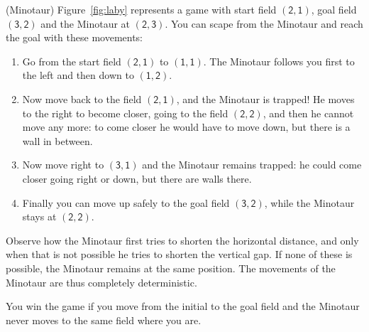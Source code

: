 \documentclass[a4paper,12pt]{article}
\begin{document}
\begin{PraktikumsAufgabe}{3}{(Minotaur)}
\noindent
Figure~\ref{fig:laby} represents a game with start field 
$(\textsf{2},\textsf{1})$, 
goal field 
$(\textsf{3},\textsf{2})$ and the Minotaur at
$(\textsf{2},\textsf{3})$.
You can scape from the Minotaur and reach the goal 
with these movements:
\begin{enumerate}
\item Go from the start field $(\textsf{2},\textsf{1})$ to $(\textsf{1},\textsf{1})$.
      The Minotaur follows you first to the left and then down to $(\textsf{1},\textsf{2})$.
\item Now move back to the field $(\textsf{2},\textsf{1})$, and the Minotaur is trapped!
      He moves to the right to become closer, going to the field $(\textsf{2},\textsf{2})$, 
      and then he cannot move any more: 
      to come closer he would have to move down, 
      but there is a wall in between.
\item Now move right to $(\textsf{3},\textsf{1})$
      and the Minotaur remains trapped: 
      he could come closer going right or down, but there are walls there.
\item Finally you can move up safely to the goal field $(\textsf{3},\textsf{2})$, 
      while the Minotaur stays at $(\textsf{2},\textsf{2})$.
\end{enumerate}
Observe how the Minotaur first tries to shorten the horizontal distance, 
and only when that is not possible he tries to shorten the vertical gap.
If none of these is possible, the Minotaur remains at the same position.
The movements of the Minotaur are thus completely deterministic.

You win the game if you move from the initial to the goal field
and the Minotaur never moves to the same field where you are.


\end{PraktikumsAufgabe}
\end{document}
